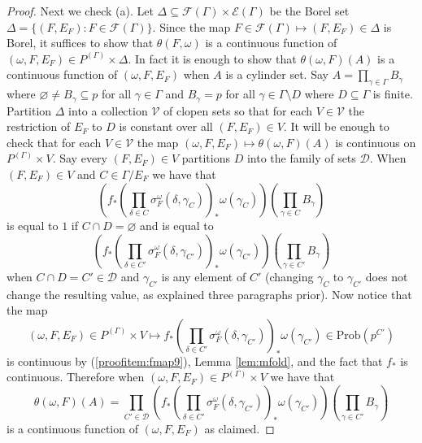 \documentclass[12pt]{amsart}
\theoremstyle{definition}
\def\cal{\mathcal}
\newcommand{\Prob}{\mathrm{Prob}}
\begin{document}
\begin{proof}
	Next we check (a). Let $\Delta \subseteq \cal F(\Gamma) \times \cal E(\Gamma)$ be the Borel set $\Delta = \{(F, E_F) : F \in \cal F(\Gamma)\}$. Since the map $F \in \cal F(\Gamma) \mapsto (F, E_F) \in \Delta$ is Borel, it suffices to show that $\theta(F, \omega)$ is a continuous function of $(\omega, F, E_F) \in P^{(\Gamma)} \times \Delta$. In fact it is enough to show that $\theta(\omega, F)(A)$ is a continuous function of $(\omega, F, E_F)$ when $A$ is a cylinder set. Say $A = \prod_{\gamma \in \Gamma} B_\gamma$ where $\varnothing \neq B_\gamma \subseteq p$ for all $\gamma \in \Gamma$ and $B_\gamma = p$ for all $\gamma \in \Gamma \setminus D$ where $D \subseteq \Gamma$ is finite. Partition $\Delta$ into a collection $\cal V$ of clopen sets so that for each $V \in \cal V$ the restriction of $E_F$ to $D$ is constant over all $(F, E_F) \in V$. It will be enough to check that for each $V \in \cal V$ the map $(\omega, F, E_F) \mapsto \theta(\omega, F)(A)$ is continuous on $P^{(\Gamma)} \times V$. Say every $(F, E_F) \in V$ partitions $D$ into the family of sets $\cal D$. When $(F, E_F) \in V$ and $C \in \Gamma / E_F$ we have that
	\[\left(f_* \left( \prod_{\delta \in C} \sigma^\omega_F(\delta, \gamma_C) \right)_* \omega(\gamma_C) \right) \left(\prod_{\gamma \in C} B_\gamma\right)\]
	is equal to $1$ if $C \cap D = \varnothing$ and is equal to
	\[\left(f_* \left( \prod_{\delta \in C'} \sigma^\omega_F(\delta, \gamma_{C'}) \right)_* \omega(\gamma_{C'}) \right) \left(\prod_{\gamma \in C'} B_\gamma \right)\]
	when $C \cap D = C' \in \cal D$ and $\gamma_{C'}$ is any element of $C'$ (changing $\gamma_C$ to $\gamma_{C'}$ does not change the resulting value, as explained three paragraphs prior). Now notice that the map
	\[(\omega, F, E_F) \in P^{(\Gamma)} \times V \mapsto f_* \left( \prod_{\delta \in C'} \sigma^\omega_F(\delta, \gamma_{C'}) \right)_* \omega(\gamma_{C'}) \in \Prob(p^{C'})\]
	is continuous by (\ref{proofitem:fmap9}), Lemma \ref{lem:mfold}, and the fact that $f_*$ is continuous. Therefore when $(\omega, F, E_F) \in P^{(\Gamma)} \times V$ we have that
	\[\theta(\omega, F)(A) = \prod_{C' \in \cal D} \left(f_* \left( \prod_{\delta \in C'} \sigma^\omega_F(\delta, \gamma_{C'}) \right)_* \omega(\gamma_{C'}) \right) \left(\prod_{\gamma \in C'} B_\gamma \right)\]
	is a continuous function of $(\omega, F, E_F)$ as claimed.
	

\end{proof}
\end{document}
